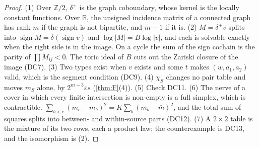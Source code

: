 \documentclass[11pt]{article}
\theoremstyle{definition}\newtheorem{definition}{Definition}\newtheorem{remark}{Remark}
\begin{document}
\begin{proof}
(1) Over $\mathbb Z/2$, $\delta^+$ is the graph coboundary, whose kernel is the locally constant functions. Over $\mathbb R$, the
unsigned incidence matrix of a connected graph has rank $m$ if the graph is not bipartite, and $m-1$ if it is. (2) $M=\delta^+v$ splits
into $\operatorname{sign}M=\delta(\operatorname{sign}v)$ and $\log|M|=B\log|v|$, and each is solvable exactly when the right side is in
the image. On a cycle the sum of the sign cochain is the parity of $\prod M_{ij}<0$. The toric ideal of $B$ cuts out the Zariski closure
of the image (DC7). (3) Two types exist when $v$ exists and some $t$ makes $(w,a_1,a_2)$ valid, which is the segment condition (DC9).
(4) $\chi_S$ changes no pair table and moves $m_S$ alone, by $2^{m-3}\varepsilon s$ (\cref{thm:F}(4)). (5) Check DC11. (6) The nerve of a cover in which every finite intersection is non-empty is a full simplex, which is contractible. $\sum_{b<c}(m_c-m_b)^2=K\sum_b(m_b-\bar m)^2$, and the total sum of squares splits into between- and within-source parts (DC12). (7) A $2\times2$ table is the mixture of its two rows, each a product law; the counterexample is DC13, and the isomorphism is (2).
\end{proof}
\end{document}
